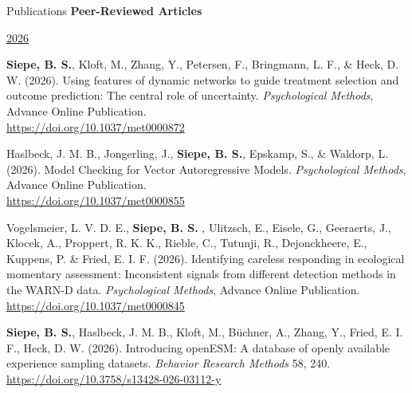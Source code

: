 \documentclass{resume} %
\begin{document}
\begin{rSection}{Publications}
\textbf{\large Peer-Reviewed Articles}

\underline{2026}

\begin{etaremune}
    \item \textbf{Siepe, B. S.}, Kloft, M., Zhang, Y., Petersen, F., Bringmann, L. F., \& Heck, D. W. (2026). Using features of dynamic networks to guide treatment selection and outcome prediction: The central role of uncertainty. \textit{Psychological Methods}, Advance Online Publication.\\
\url{https://doi.org/10.1037/met0000872}
    \item Haslbeck, J. M. B., Jongerling, J., \textbf{Siepe, B. S.}, Epskamp, S., \& Waldorp, L. (2026). Model Checking for Vector Autoregressive Models. \textit{Psychological Methods}, Advance Online Publication.\\
\url{https://doi.org/10.1037/met0000855}
    \item Vogelsmeier, L. V. D. E., \textbf{Siepe, B. S.} , Ulitzsch, E., Eisele, G., Geeraerts, J., Klocek, A., Proppert, R. K. K., Rieble, C., Tutunji, R., Dejonckheere, E., Kuppens, P. \& Fried, E. I. F. (2026). Identifying careless responding in ecological momentary assessment: Inconsistent signals from different detection methods in the WARN-D data. \textit{Psychological Methods}, Advance Online Publication. \\ 
    \url{https://doi.org/10.1037/met0000845}
    \item \textbf{Siepe, B. S.}, Haslbeck, J. M. B., Kloft, M., Büchner, A., Zhang, Y., Fried, E. I. F., Heck, D. W. (2026). Introducing openESM: A database of openly available experience sampling datasets. \textit{Behavior Research Methods} 58, 240. \\ \url{https://doi.org/10.3758/s13428-026-03112-y}
    

\end{etaremune}
\end{rSection}
\end{document}
